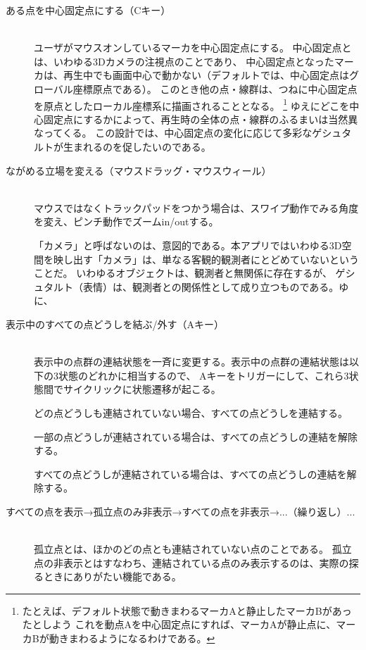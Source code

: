 \begin{description}
    \item [ある点を中心固定点にする（Cキー）]\mbox{}\\
    ユーザがマウスオンしているマーカを中心固定点にする。
    中心固定点とは、いわゆる3Dカメラの注視点のことであり、
    中心固定点となったマーカは、再生中でも画面中心で動かない（デフォルトでは、中心固定点はグローバル座標原点である）。
    このとき他の点・線群は、つねに中心固定点を原点としたローカル座標系に描画されることとなる。
    \footnote{
      たとえば、デフォルト状態で動きまわるマーカAと静止したマーカBがあったとしよう
      これを動点Aを中心固定点にすれば、マーカAが静止点に、マーカBが動きまわるようになるわけである。
      }    
    ゆえにどこを中心固定点にするかによって、再生時の全体の点・線群のふるまいは当然異なってくる。
    この設計では、中心固定点の変化に応じて多彩なゲシュタルトが生まれるのを促したいのである。

  \item [ながめる立場を変える（マウスドラッグ・マウスウィール）]\mbox{}\\
  マウスではなくトラックパッドをつかう場合は、スワイプ動作でみる角度を変え、ピンチ動作でズームin/outする。
  
  「カメラ」と呼ばないのは、意図的である。本アプリではいわゆる3D空間を映し出す「カメラ」は、単なる客観的観測者にとどめていないということだ。
  いわゆるオブジェクトは、観測者と無関係に存在するが、
  ゲシュタルト（表情）は、観測者との関係性として成り立つものである。ゆに、

  
  \item [表示中のすべての点どうしを結ぶ/外す（Aキー）]\mbox{}\\
  表示中の点群の連結状態を一斉に変更する。表示中の点群の連結状態は以下の3状態のどれかに相当するので、
  Aキーをトリガーにして、これら3状態間でサイクリックに状態遷移が起こる。

  どの点どうしも連結されていない場合、すべての点どうしを連結する。

  一部の点どうしが連結されている場合は、すべての点どうしの連結を解除する。

  すべての点どうしが連結されている場合は、すべての点どうしの連結を解除する。

  
  \item [すべての点を表示→孤立点のみ非表示→すべての点を非表示→...（繰り返し）...]\mbox{}\\
  孤立点とは、ほかのどの点とも連結されていない点のことである。
  孤立点の非表示とはすなわち、連結されている点のみ表示するのは、実際の探るときにありがたい機能である。
\end{description}

